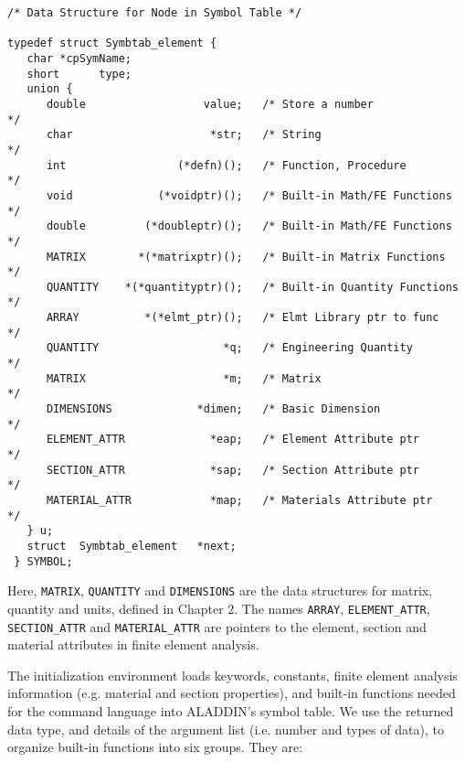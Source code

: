 \begin{footnotesize}
\begin{verbatim}
/* Data Structure for Node in Symbol Table */
 
typedef struct Symbtab_element {
   char *cpSymName;
   short      type;
   union {
      double                  value;   /* Store a number              */
      char                     *str;   /* String                      */
      int                 (*defn)();   /* Function, Procedure         */
      void             (*voidptr)();   /* Built-in Math/FE Functions  */
      double         (*doubleptr)();   /* Built-in Math/FE Functions  */
      MATRIX        *(*matrixptr)();   /* Built-in Matrix Functions   */
      QUANTITY    *(*quantityptr)();   /* Built-in Quantity Functions */
      ARRAY          *(*elmt_ptr)();   /* Elmt Library ptr to func    */
      QUANTITY                   *q;   /* Engineering Quantity        */
      MATRIX                     *m;   /* Matrix                      */
      DIMENSIONS             *dimen;   /* Basic Dimension             */
      ELEMENT_ATTR             *eap;   /* Element Attribute ptr       */
      SECTION_ATTR             *sap;   /* Section Attribute ptr       */
      MATERIAL_ATTR            *map;   /* Materials Attribute ptr     */
   } u;
   struct  Symbtab_element   *next;
 } SYMBOL;
\end{verbatim}
\end{footnotesize}

\vspace{0.15 in}\noindent
Here, {\tt MATRIX}, {\tt QUANTITY} and {\tt DIMENSIONS} are the data structures 
for matrix, quantity and units, defined in Chapter 2.
The names {\tt ARRAY}, {\tt ELEMENT\_ATTR},
{\tt SECTION\_ATTR} and {\tt MATERIAL\_ATTR} are pointers to the
element, section and material attributes in finite element analysis.

\vspace{0.15 in}
\noindent\hspace{0.50 in}
The initialization environment loads keywords, constants,
finite element analysis information (e.g. material and section properties),
and built-in functions needed for the command language into ALADDIN's symbol table.
We use the returned data type, and details of the argument
list (i.e.  number and types of data), to organize
built-in functions into six groups.  They are:

